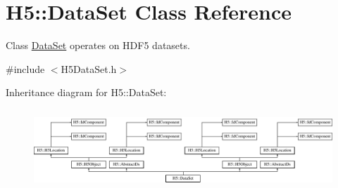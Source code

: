 \hypertarget{class_h5_1_1_data_set}{}\section{H5\+:\+:Data\+Set Class Reference}
\label{class_h5_1_1_data_set}


Class \hyperlink{class_h5_1_1_data_set}{Data\+Set} operates on H\+D\+F5 datasets.  




{\ttfamily \#include $<$H5\+Data\+Set.\+h$>$}

Inheritance diagram for H5\+:\+:Data\+Set\+:\begin{figure}[H]
\begin{center}
\leavevmode
\includegraphics[height=3.043478cm]{class_h5_1_1_data_set}
\end{center}
\end{figure}
